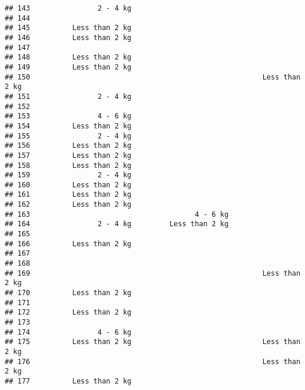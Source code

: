 \documentclass[
]{article}
\begin{document}
\begin{verbatim}
## 143                2 - 4 kg                                             
## 144                                                                     
## 145          Less than 2 kg                                             
## 146          Less than 2 kg                                             
## 147                                                                     
## 148          Less than 2 kg                                             
## 149          Less than 2 kg                                             
## 150                                                       Less than 2 kg
## 151                2 - 4 kg                                             
## 152                                                                     
## 153                4 - 6 kg                                             
## 154          Less than 2 kg                                             
## 155                2 - 4 kg                                             
## 156          Less than 2 kg                                             
## 157          Less than 2 kg                                             
## 158          Less than 2 kg                                             
## 159                2 - 4 kg                                             
## 160          Less than 2 kg                                             
## 161          Less than 2 kg                                             
## 162          Less than 2 kg                                             
## 163                                       4 - 6 kg                      
## 164                2 - 4 kg         Less than 2 kg                      
## 165                                                                     
## 166          Less than 2 kg                                             
## 167                                                                     
## 168                                                                     
## 169                                                       Less than 2 kg
## 170          Less than 2 kg                                             
## 171                                                                     
## 172          Less than 2 kg                                             
## 173                                                                     
## 174                4 - 6 kg                                             
## 175          Less than 2 kg                               Less than 2 kg
## 176                                                       Less than 2 kg
## 177          Less than 2 kg                                             

\end{verbatim}
\end{document}
